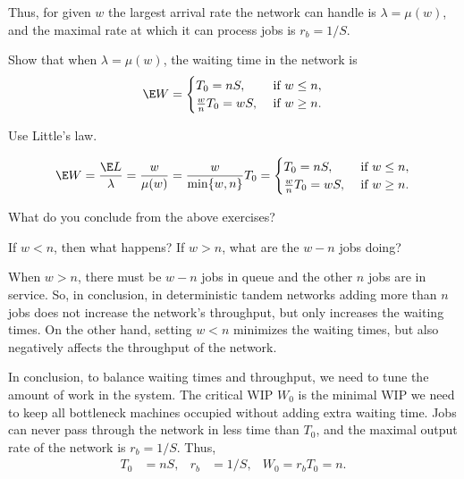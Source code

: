 Thus, for given $w$ the largest arrival rate the network can handle is $\lambda = \mu(w)$, and the maximal rate at which it can process jobs is $r_b=1/S$. 

\begin{exercise}
 Show that when $\lambda=\mu(w)$, the waiting time in the network is 
\begin{equation*}
 \E W = 
\begin{cases}
 T_0=n S, & \text{ if } w\leq n, \\
 \frac{w}{n} T_0 = w S, & \text{ if } w\geq n.
\end{cases}
\end{equation*}
\begin{hint}
 Use Little's law.
\end{hint}
\begin{solution}
\begin{equation*}
 \begin{split}
 \E W 
= \frac{\E L}{\lambda} = \frac{w}{\mu(w)} = \frac{w}{\min\{w, n\}} T_0 
=
\begin{cases}
 T_0=n S, & \text{ if } w\leq n, \\
 \frac{w}{n} T_0 = w S, & \text{ if } w\geq n.
\end{cases}
 \end{split}
\end{equation*}
\end{solution}
\end{exercise}

\begin{exercise}
 What do you conclude from the above exercises?
\begin{hint}
 If $w<n$, then what happens? If $w>n$, what are the $w-n$ jobs doing?
\end{hint}
\begin{solution}
When $w>n$, there must be $w-n$ jobs in queue and the
other $n$ jobs are in service. So, in conclusion, in deterministic
tandem networks adding more than $n$ jobs does not increase the
network's throughput, but only increases the waiting times. On the other
hand, setting $w<n$ minimizes the waiting times, but also negatively
affects the throughput of the network. 
\end{solution}
\end{exercise}

In conclusion, to balance waiting times and throughput, we need to tune the amount of work in the system. The critical WIP $W_0$ is the minimal WIP we need to keep all bottleneck machines occupied without adding extra waiting time. Jobs can never pass through the network in less time than $T_0$, and the maximal output rate of the network is $r_b = 1/S$. Thus, 
\begin{align}\label{eq:t0}
T_0&= n S, & r_b&= 1/S, & W_0 = r_b T_0 = n.
\end{align}


